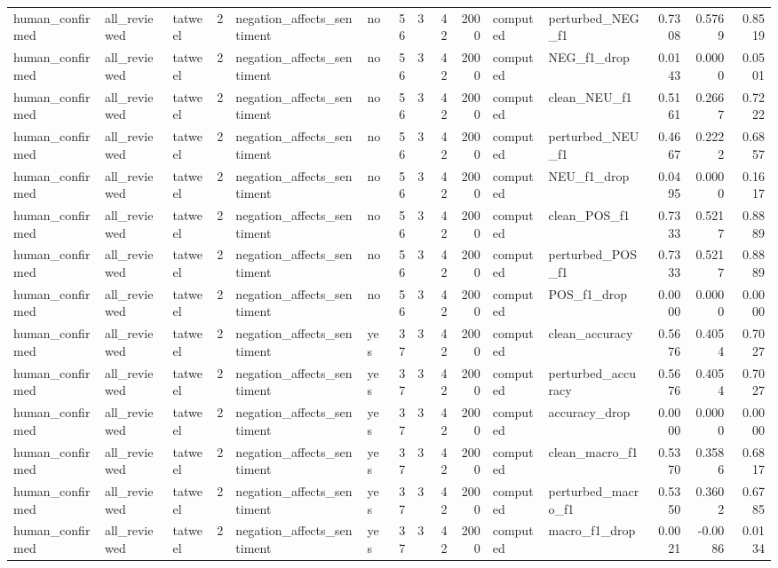 \begin{tabular}{lllrllrrrrllrrr}
human_confirmed & all_reviewed & tatweel & 2 & negation_affects_sentiment & no & 56 & 3 & 42 & 2000 & computed & perturbed_NEG_f1 & 0.7308 & 0.5769 & 0.8519 \\
human_confirmed & all_reviewed & tatweel & 2 & negation_affects_sentiment & no & 56 & 3 & 42 & 2000 & computed & NEG_f1_drop & 0.0143 & 0.0000 & 0.0501 \\
human_confirmed & all_reviewed & tatweel & 2 & negation_affects_sentiment & no & 56 & 3 & 42 & 2000 & computed & clean_NEU_f1 & 0.5161 & 0.2667 & 0.7222 \\
human_confirmed & all_reviewed & tatweel & 2 & negation_affects_sentiment & no & 56 & 3 & 42 & 2000 & computed & perturbed_NEU_f1 & 0.4667 & 0.2222 & 0.6857 \\
human_confirmed & all_reviewed & tatweel & 2 & negation_affects_sentiment & no & 56 & 3 & 42 & 2000 & computed & NEU_f1_drop & 0.0495 & 0.0000 & 0.1617 \\
human_confirmed & all_reviewed & tatweel & 2 & negation_affects_sentiment & no & 56 & 3 & 42 & 2000 & computed & clean_POS_f1 & 0.7333 & 0.5217 & 0.8889 \\
human_confirmed & all_reviewed & tatweel & 2 & negation_affects_sentiment & no & 56 & 3 & 42 & 2000 & computed & perturbed_POS_f1 & 0.7333 & 0.5217 & 0.8889 \\
human_confirmed & all_reviewed & tatweel & 2 & negation_affects_sentiment & no & 56 & 3 & 42 & 2000 & computed & POS_f1_drop & 0.0000 & 0.0000 & 0.0000 \\
human_confirmed & all_reviewed & tatweel & 2 & negation_affects_sentiment & yes & 37 & 3 & 42 & 2000 & computed & clean_accuracy & 0.5676 & 0.4054 & 0.7027 \\
human_confirmed & all_reviewed & tatweel & 2 & negation_affects_sentiment & yes & 37 & 3 & 42 & 2000 & computed & perturbed_accuracy & 0.5676 & 0.4054 & 0.7027 \\
human_confirmed & all_reviewed & tatweel & 2 & negation_affects_sentiment & yes & 37 & 3 & 42 & 2000 & computed & accuracy_drop & 0.0000 & 0.0000 & 0.0000 \\
human_confirmed & all_reviewed & tatweel & 2 & negation_affects_sentiment & yes & 37 & 3 & 42 & 2000 & computed & clean_macro_f1 & 0.5370 & 0.3586 & 0.6817 \\
human_confirmed & all_reviewed & tatweel & 2 & negation_affects_sentiment & yes & 37 & 3 & 42 & 2000 & computed & perturbed_macro_f1 & 0.5350 & 0.3602 & 0.6785 \\
human_confirmed & all_reviewed & tatweel & 2 & negation_affects_sentiment & yes & 37 & 3 & 42 & 2000 & computed & macro_f1_drop & 0.0021 & -0.0086 & 0.0134 \\

\end{tabular}
